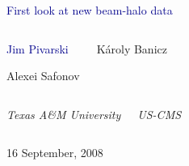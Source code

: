 \documentclass[compress]{beamer}
\begin{document}
\begin{frame}
\vfill
\begin{center}
\textcolor{darkblue}{\Large First look at new beam-halo data}

\vfill
\begin{columns}
\begin{center}
\large
\textcolor{darkblue}{Jim Pivarski}

\vspace{0.2 cm}
Alexei Safonov
\end{center}

\begin{center}
\large
K\'aroly Banicz
\end{center}
\end{columns}

\begin{columns}
\begin{center}
\scriptsize
{\it Texas A\&M University}
\end{center}
\begin{center}
\scriptsize
{\it US-CMS}
\end{center}
\end{columns}

\vfill
16 September, 2008

\end{center}
\end{frame}

\end{document}
